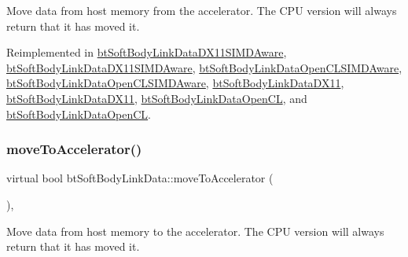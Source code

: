 Move data from host memory from the accelerator. The C\+PU version will always return that it has moved it. 

Reimplemented in \hyperlink{classbtSoftBodyLinkDataDX11SIMDAware_a86ffcd3e1eae29d3a9019790d4172990}{bt\+Soft\+Body\+Link\+Data\+D\+X11\+S\+I\+M\+D\+Aware}, \hyperlink{classbtSoftBodyLinkDataDX11SIMDAware_a939884d3e31eb6599b71e466e96f9fc9}{bt\+Soft\+Body\+Link\+Data\+D\+X11\+S\+I\+M\+D\+Aware}, \hyperlink{classbtSoftBodyLinkDataOpenCLSIMDAware_a9eed0794cbaa4b7f0c8dd1fc5570c15f}{bt\+Soft\+Body\+Link\+Data\+Open\+C\+L\+S\+I\+M\+D\+Aware}, \hyperlink{classbtSoftBodyLinkDataOpenCLSIMDAware_a5ae3174b36d5ee2c13c96ddf775785b8}{bt\+Soft\+Body\+Link\+Data\+Open\+C\+L\+S\+I\+M\+D\+Aware}, \hyperlink{classbtSoftBodyLinkDataDX11_aad757252b4538a6f8f6eca526335e71d}{bt\+Soft\+Body\+Link\+Data\+D\+X11}, \hyperlink{classbtSoftBodyLinkDataDX11_a503f2df316127641cde3ab997b511735}{bt\+Soft\+Body\+Link\+Data\+D\+X11}, \hyperlink{classbtSoftBodyLinkDataOpenCL_a47cc8710e80d8e3d00775960c358058d}{bt\+Soft\+Body\+Link\+Data\+Open\+CL}, and \hyperlink{classbtSoftBodyLinkDataOpenCL_a67152548f633d131fbdb33d323f701db}{bt\+Soft\+Body\+Link\+Data\+Open\+CL}.

\mbox{\label{classbtSoftBodyLinkData_a6cce268f804d465f3bc998771d3a7433}} 
\subsubsection{\texorpdfstring{move\+To\+Accelerator()}{moveToAccelerator()}\hspace{0.1cm}{\footnotesize\ttfamily [1/2]}}
{\footnotesize\ttfamily virtual bool bt\+Soft\+Body\+Link\+Data\+::move\+To\+Accelerator (\begin{DoxyParamCaption}{ }\end{DoxyParamCaption})\hspace{0.3cm}{\ttfamily [inline]}, {\ttfamily [virtual]}}

Move data from host memory to the accelerator. The C\+PU version will always return that it has moved it. 

